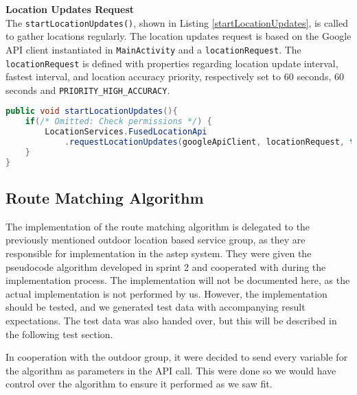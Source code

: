 \textbf{Location Updates Request}\\
The \texttt{startLocationUpdates()}, shown in Listing \ref{startLocationUpdates}, is called to gather locations regularly.
The location updates request is based on the Google API client instantiated in \texttt{MainActivity} and a \texttt{locationRequest}.
The \texttt{locationRequest} is defined with properties regarding location update interval, fastest interval, and location accuracy priority, respectively set to 60 seconds, 60 seconds and \texttt{PRIORITY\_HIGH\_ACCURACY}.

\begin{lstlisting}[language=Java, label=startLocationUpdates, caption=Start location updates functions.]
public void startLocationUpdates(){
	if(/* Omitted: Check permissions */) {
		LocationServices.FusedLocationApi
			.requestLocationUpdates(googleApiClient, locationRequest, this);
	}
}
\end{lstlisting}

\subsection{Route Matching Algorithm}\label{sec:routematchingalgorith}
The implementation of the route matching algorithm is delegated to the previously mentioned outdoor location based service group, as they are responsible for implementation in the \gls{astep} system.
They were given the pseudocode algorithm developed in sprint 2 and cooperated with during the implementation process.
The implementation will not be documented here, as the actual implementation is not performed by us.
However, the implementation should be tested, and we generated test data with accompanying result expectations.
The test data was also handed over, but this will be described in the following test section.

In cooperation with the outdoor group, it were decided to send every variable for the algorithm as parameters in the API call.
This were done so we would have control over the algorithm to ensure it performed as we saw fit.